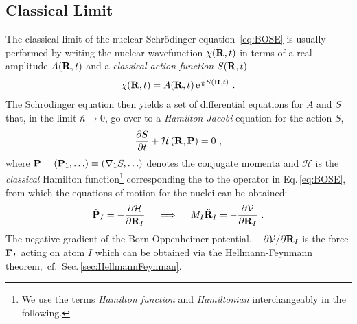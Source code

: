 \subsection{Classical Limit}
The classical limit of the nuclear Schr\"odinger equation~\eqref{eq:BOSE} is usually performed by writing the nuclear wavefunction $\chi ({\bf R}, t)$ in terms of a real amplitude $A({\bf R}, t)$ and a \emph{classical action function} $S({\bf R}, t)$~\cite{Dirac1981,Landau2013,Marx2009}
\begin{align}
\chi({\bf R}, t) = A({\bf R}, t) \, {\rm e}^{\frac{\im}{\hbar} S({\bf R}, t)}~.
\label{eq:class.1}
\end{align}
The Schr\"odinger equation then yields a set of differential equations for $A$ and $S$ that, in the limit $\hbar \to 0$, go over to a \emph{Hamilton-Jacobi} equation for the action $S$,
\begin{align}
\frac{\partial S}{\partial t} + \mathcal H \left({\bf R}, {\bf P}\right)
= 0~,
\label{eq:HamiltonJacobi}
\end{align}
where ${\bf P} = ({\bf P}_1, \ldots) \equiv ({\bf \nabla}_1 S, \ldots)$ denotes the conjugate momenta and $\mathcal H$ is the \emph{classical} Hamilton function\footnote{We use the terms \emph{Hamilton function} and \emph{Hamiltonian} interchangeably in the following.} corresponding the to the operator in Eq.\,\eqref{eq:BOSE}, from which the equations of motion for the nuclei can be obtained:
\begin{align}
\dot{{\bf P}}_I 
= -\frac{\partial \mathcal H}{\partial {\bf R}_I}
\quad\implies\quad M_I \ddot{\bf R}_I
= -\frac{\partial \mathcal V}{\partial {\bf R}_I}~.
\label{eq:dyn.eom.classical}
\end{align}
The negative gradient of the Born-Oppenheimer potential, 
$-\partial \mathcal V / \partial {\bf R}_I$ is the force ${\bf F}_I$ acting on atom $I$ which can be obtained via the Hellmann-Feynmann theorem,~cf.~Sec.\,\ref{sec:HellmannFeynman}.

